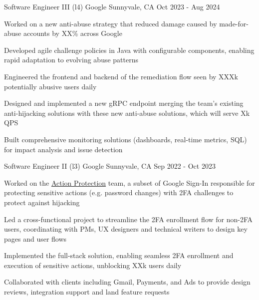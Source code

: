 
\hypersetup{
    colorlinks=true,
    linkcolor=blue,
    filecolor=magenta,
    urlcolor=awesome,
}



\begin{cventries}

  \cventry
	{Software Engineer III (l4)}
    {Google}
    {Sunnyvale, CA}
    {Oct 2023 - Aug 2024}
    {
      \begin{cvitems}
	    \item Worked on a new anti-abuse strategy that reduced damage caused by made-for-abuse accounts by XX\% across Google
		\item Developed agile challenge policies in Java with configurable components, enabling rapid adaptation to evolving abuse patterns
		\item Engineered the frontend and backend of the remediation flow seen by XXXk potentially abusive users daily
		\item Designed and implemented a new gRPC endpoint merging the team's existing anti-hijacking solutions with these new anti-abuse solutions, which will serve Xk QPS
		\item Built comprehensive monitoring solutions (dashboards, real-time metrics, SQL) for impact analysis and issue detection
      \end{cvitems}
    }

  \cventry
	{Software Engineer II (l3)}
    {Google}
    {Sunnyvale, CA}
    {Sep 2022 - Oct 2023}
    {
      \begin{cvitems}
	  \item Worked on the \href{https://support.google.com/accounts/answer/7162782}{Action Protection} team, a subset of Google Sign-In responsible for protecting sensitive actions (e.g. password changes) with 2FA challenges to protect against hijacking
	  \item Led a cross-functional project to streamline the 2FA enrollment flow for non-2FA users, coordinating with PMs, UX designers and technical writers to design key pages and user flows
	  \item Implemented the full-stack solution, enabling seamless 2FA enrollment and execution of sensitive actions, unblocking XXk users daily
	  \item Collaborated with clients including Gmail, Payments, and Ads to provide design reviews, integration support and land feature requests
      \end{cvitems}
    }


\end{cventries}
